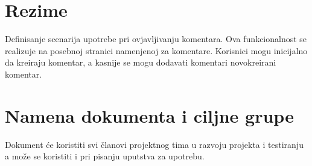 \section{Rezime}
Definisanje scenarija upotrebe pri ovjavljivanju komentara. Ova funkcionalnost se realizuje na posebnoj stranici namenjenoj za komentare. Korisnici mogu inicijalno da kreiraju komentar, a kasnije se mogu dodavati komentari novokreirani komentar.
\section{Namena dokumenta i ciljne grupe}
Dokument će koristiti svi članovi projektnog tima u razvoju projekta i testiranju a može se koristiti i pri pisanju uputstva za upotrebu.
